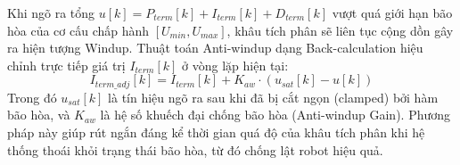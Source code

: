 Khi ngõ ra tổng $u[k] = P_{term}[k] + I_{term}[k] + D_{term}[k]$ vượt quá giới hạn bão hòa của cơ cấu chấp hành $[U_{min}, U_{max}]$, khâu tích phân sẽ liên tục cộng dồn gây ra hiện tượng Windup. Thuật toán Anti-windup dạng Back-calculation hiệu chỉnh trực tiếp giá trị $I_{term}[k]$ ở vòng lặp hiện tại:
\begin{equation}
I_{term\_adj}[k] = I_{term}[k] + K_{aw} \cdot \left( u_{sat}[k] - u[k] \right)
\end{equation}
Trong đó $u_{sat}[k]$ là tín hiệu ngõ ra sau khi đã bị cắt ngọn (clamped) bởi hàm bão hòa, và $K_{aw}$ là hệ số khuếch đại chống bão hòa (Anti-windup Gain). Phương pháp này giúp rút ngắn đáng kể thời gian quá độ của khâu tích phân khi hệ thống thoái khỏi trạng thái bão hòa, từ đó chống lật robot hiệu quả.

